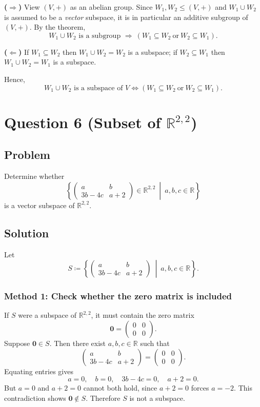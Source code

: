 \documentclass[12pt]{article}
\begin{document}
\textbf{(\(\Rightarrow\))} View \((V,+)\) as an abelian group. Since \(W_1,W_2\le (V,+)\) and \(W_1\cup W_2\) is assumed
to be a \emph{vector} subspace, it is in particular an additive subgroup of \((V,+)\). By the theorem,
\[
W_1\cup W_2 \text{ is a subgroup } \Longrightarrow \ (W_1\subseteq W_2 \ \text{or}\ W_2\subseteq W_1).
\]

\textbf{(\(\Leftarrow\))} If \(W_1\subseteq W_2\) then \(W_1\cup W_2=W_2\) is a subspace; if \(W_2\subseteq W_1\) then
\(W_1\cup W_2=W_1\) is a subspace.

\medskip
Hence,
\[
\boxed{\,W_1\cup W_2\text{ is a subspace of }V \Longleftrightarrow (W_1\subseteq W_2\ \text{or}\ W_2\subseteq W_1).\,}
\]

\newpage
\section{Question 6 (Subset of \(\mathbb{R}^{2,2}\))}
\subsection{Problem}
Determine whether
\[
\left\{
\begin{pmatrix}
a & b\\
3b-4c & a+2
\end{pmatrix}
\in \mathbb{R}^{2,2}
\ \middle|\ a,b,c\in\mathbb{R}
\right\}
\]
is a vector subspace of \(\mathbb{R}^{2,2}\).

\subsection{Solution}
Let
\[
S \coloneqq \left\{
\begin{pmatrix}
a & b\\
3b-4c & a+2
\end{pmatrix}
\ \middle|\ a,b,c\in\mathbb{R}
\right\}.
\]

\subsubsection{Method 1: Check whether the zero matrix is included}
If \(S\) were a subspace of \(\mathbb{R}^{2,2}\), it must contain the zero matrix
\[
\mathbf{0}=
\begin{pmatrix}
0&0\\0&0
\end{pmatrix}.
\]
Suppose \(\mathbf{0}\in S\). Then there exist \(a,b,c\in\mathbb{R}\) such that
\[
\begin{pmatrix}
a & b\\
3b-4c & a+2
\end{pmatrix}
=
\begin{pmatrix}
0 & 0\\
0 & 0
\end{pmatrix}.
\]
Equating entries gives
\[
a=0,\quad b=0,\quad 3b-4c=0,\quad a+2=0.
\]
But \(a=0\) and \(a+2=0\) cannot both hold, since \(a+2=0\) forces \(a=-2\).
This contradiction shows \(\mathbf{0}\notin S\).
Therefore \(S\) is not a subspace.
\end{document}
